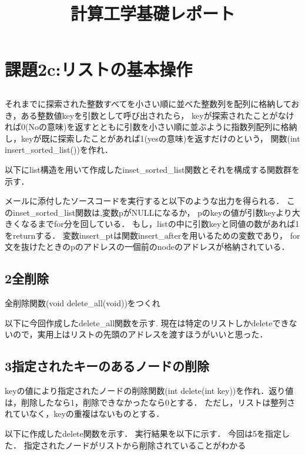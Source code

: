 \documentclass[titlepage]{jarticle}
\title{計算工学基礎レポート}
\author{}
\begin{document}
\section*{課題2c:リストの基本操作}
\subsection*{}

それまでに探索された整数すべてを小さい順に並べた整数列を配列に格納しておき，ある整数値keyを引数として呼び出されたら，
keyが探索されたことがなければ0(Noの意味)を返すとともに引数を小さい順に並ぶように指数列配列に格納し，keyが既に探索したことがあれば1(yesの意味)を返すだけのという，
関数(int insert\_sorted\_list())を作れ． 

以下にlist構造を用いて作成したinset\_sorted\_list関数とそれを構成する関数群を示す．

メールに添付したソースコードを実行すると以下のような出力を得られる．
このinset\_sorted\_list関数は,変数pがNULLになるか，
pのkeyの値が引数keyより大きくなるまでfor分を回している．
もし，listの中に引数keyと同値の数があれば1をreturnする．
変数insert\_ptは関数insert\_afterを用いるための変数であり，
for文を抜けたときのpのアドレスの一個前のnodeのアドレスが格納されている．
\subsection*{2全削除}
全削除関数(void delete\_all(void))をつくれ

以下に今回作成したdelete\_all関数を示す.
現在は特定のリストしかdeleteできないので，実用上はリストの先頭のアドレスを渡すほうがいいと思った．
\subsection*{3指定されたキーのあるノードの削除}
keyの値により指定されたノードの削除関数(int delete(int key))を作れ．返り値は，削除したなら1，削除できなかったなら0とする．
ただし，リストは整列されていなく，keyの重複はないものとする．

以下に作成したdelete関数を示す．
実行結果を以下に示す．
今回は5を指定した．
指定されたノードがリストから削除されていることがわかる
\end{document}
